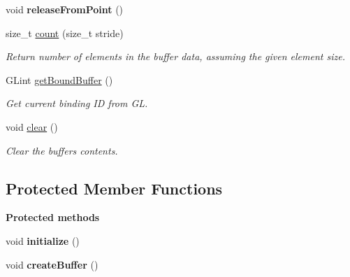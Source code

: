 \begin{Indent}
\begin{DoxyCompactItemize}
\mbox{\label{classrev_1_1_g_l_buffer_a75ec3ef6ed2d7c548396b505c692f088}} 
void {\bfseries release\+From\+Point} ()
\item 
\mbox{\label{classrev_1_1_g_l_buffer_a9136bb5687280f6afd40a5792bb231f2}} 
size\+\_\+t \mbox{\hyperlink{classrev_1_1_g_l_buffer_a9136bb5687280f6afd40a5792bb231f2}{count}} (size\+\_\+t stride)
\begin{DoxyCompactList}\small\item\em Return number of elements in the buffer data, assuming the given element size. \end{DoxyCompactList}\item 
\mbox{\label{classrev_1_1_g_l_buffer_ae35e081deb3c4736dfd9488c2d7d7aac}} 
G\+Lint \mbox{\hyperlink{classrev_1_1_g_l_buffer_ae35e081deb3c4736dfd9488c2d7d7aac}{get\+Bound\+Buffer}} ()
\begin{DoxyCompactList}\small\item\em Get current binding ID from GL. \end{DoxyCompactList}\item 
\mbox{\label{classrev_1_1_g_l_buffer_a2d116a1a6d1e7fa77b5724c6c8eefa28}} 
void \mbox{\hyperlink{classrev_1_1_g_l_buffer_a2d116a1a6d1e7fa77b5724c6c8eefa28}{clear}} ()
\begin{DoxyCompactList}\small\item\em Clear the buffer\textquotesingle{}s contents. \end{DoxyCompactList}\end{DoxyCompactItemize}
\end{Indent}
\subsection*{Protected Member Functions}
\begin{Indent}\textbf{ Protected methods}\par
\begin{DoxyCompactItemize}
\item 
\mbox{\label{classrev_1_1_g_l_buffer_a709a097da776cf05042f2e89266d20f0}} 
void {\bfseries initialize} ()
\item 
\mbox{\label{classrev_1_1_g_l_buffer_ac6451bf8f52b0168a3adf87209fb820f}} 
void {\bfseries create\+Buffer} ()
\end{DoxyCompactItemize}
\end{Indent}
